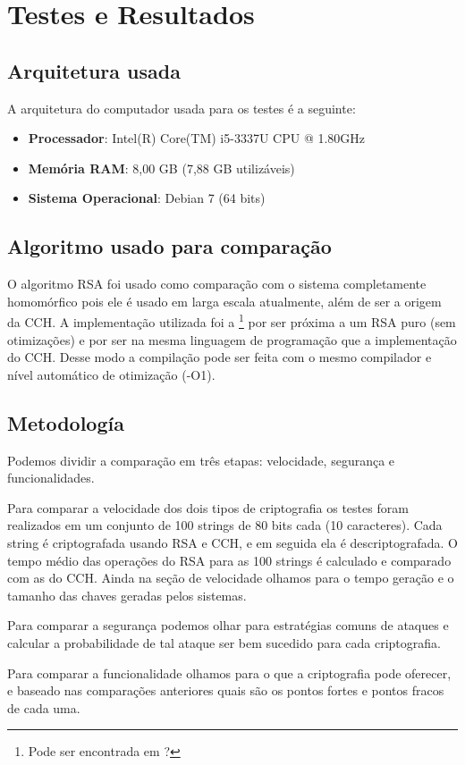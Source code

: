 \chapter{Testes e Resultados}
\label{testes}
\section{Arquitetura usada}
A arquitetura do computador usada para os testes é a seguinte:
\begin{itemize}
	\item \textbf{Processador}: Intel(R) Core(TM) i5-3337U CPU @ 1.80GHz
	\item \textbf{Memória RAM}: 8,00 GB (7,88 GB utilizáveis)
	\item \textbf{Sistema Operacional}: Debian 7 (64 bits)
\end{itemize}

\section{Algoritmo usado para comparação}
O algoritmo RSA foi usado como comparação com o sistema completamente homomórfico pois ele é usado em larga escala atualmente, além de ser a origem da CCH. A implementação utilizada foi a \footnote{Pode ser encontrada em ?} por ser próxima a um RSA puro (sem otimizações) e por ser na mesma linguagem de programação que a implementação do CCH. Desse modo a compilação pode ser feita com o mesmo compilador e nível automático de otimização (-O1).
	
\section{Metodología}
Podemos dividir a comparação em três etapas: velocidade, segurança e funcionalidades.
	
Para comparar a velocidade dos dois tipos de criptografia os testes foram realizados em um conjunto de 100 strings de 80 bits cada (10 caracteres). Cada string é criptografada usando RSA e CCH, e em seguida ela é descriptografada. O tempo médio das operações do RSA para as 100 strings é calculado e comparado com as do CCH. Ainda na seção de velocidade olhamos para o tempo geração e o tamanho das chaves geradas pelos sistemas.
	
Para comparar a segurança podemos olhar para estratégias comuns de ataques e calcular a probabilidade de tal ataque ser bem sucedido para cada criptografia.
	
Para comparar a funcionalidade olhamos para o que a criptografia pode oferecer, e baseado nas comparações anteriores quais são os pontos fortes e pontos fracos de cada uma.
	
